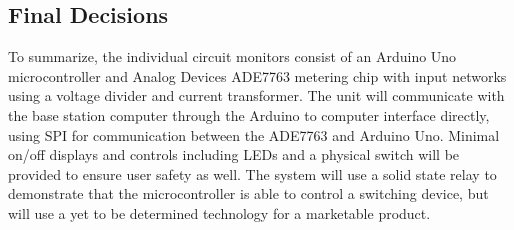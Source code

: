 \subsection{Final Decisions}
To summarize, the individual circuit monitors consist of an Arduino Uno microcontroller and Analog Devices ADE7763 metering chip with input networks using a voltage divider and current transformer. The unit will communicate with the base station computer through the Arduino to computer interface directly, using SPI for communication between the ADE7763 and Arduino Uno. Minimal on/off displays and controls including LEDs and a physical switch will be provided to ensure user safety as well. The system will use a solid state relay to demonstrate that the microcontroller is able to control a switching device, but will use a yet to be determined technology for a marketable product.